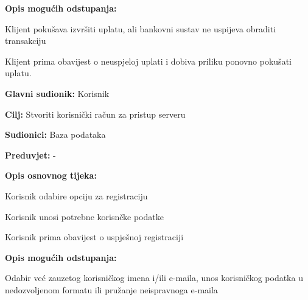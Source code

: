 {\begin{packed_item}
\begin{packed_enum}
	\end{packed_enum}
	
	\item  \textbf{Opis mogućih odstupanja:}
	\item[] \begin{packed_item}
		
		\item[3.a] Klijent pokušava izvršiti uplatu, ali bankovni sustav ne uspijeva obraditi transakciju
		\item[] \begin{packed_enum}
			
			\item Klijent prima obavijest o neuspjeloj uplati i dobiva priliku ponovno pokušati uplatu.
			
		\end{packed_enum}
		
	\end{packed_item}
	
\end{packed_item}
\newpage
\noindent {}
\begin{packed_item}
	
	\item \textbf{Glavni sudionik: } Korisnik
	\item  \textbf{Cilj:} Stvoriti korisnički račun za pristup serveru
	\item  \textbf{Sudionici:} Baza podataka
	\item  \textbf{Preduvjet:} -
	\item  \textbf{Opis osnovnog tijeka:}
	
	\item[] \begin{packed_enum}
		
		\item Korisnik odabire opciju za registraciju
		\item Korisnik unosi potrebne korisnčke podatke
		\item Korisnik prima obavijest o uspješnoj registraciji
		
	\end{packed_enum}
		\item  \textbf{Opis mogućih odstupanja:}
	\item[] \begin{packed_item}
		
		\item[2.a] Odabir već zauzetog korisničkog imena i/ili e-maila, unos korisničkog podatka u nedozvoljenom formatu ili pružanje neispravnoga e-maila
		\item[] \begin{packed_enum}
			

\end{packed_enum}
\end{packed_item}
\end{packed_item}}
